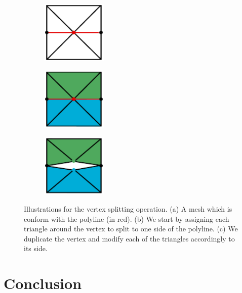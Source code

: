 \begin{figure}[p]
\centering
\begin{subfigure}[c]{0.3\linewidth}
\centering
\includegraphics[height=3cm]{images/cutting-mig2015/vertex_splitting_1.pdf}
\caption{\label{fig:vertexSplitting1}}
\end{subfigure}
\begin{subfigure}[c]{0.3\linewidth}
\centering
\includegraphics[height=3cm]{images/cutting-mig2015/vertex_splitting_2.pdf}
\caption{\label{fig:vertexSplitting2}}
\end{subfigure}
\begin{subfigure}[c]{0.3\linewidth}
\centering
\includegraphics[height=3cm]{images/cutting-mig2015/vertex_splitting_3.pdf}
\caption{\label{fig:vertexSplitting3}}
\end{subfigure}
\caption[Frame-based cutting: Vertex splitting]{\label{fig:vertexSplitting} Illustrations for the vertex splitting operation. (a) A mesh which is conform with the polyline (in red). (b) We start by assigning each triangle around the vertex to split to one side of the polyline. (c) We duplicate the vertex and modify each of the triangles accordingly to its side.}
\end{figure}

\clearpage 

\section{Conclusion} \label{sec:cutting_conclusion}

